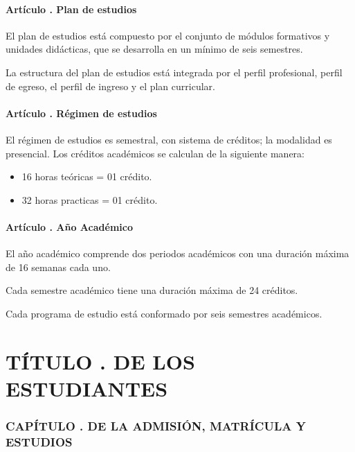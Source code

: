 \subsection{Artículo . Plan de estudios}
\addtocounter{ns}{1}
El plan de estudios está compuesto por el conjunto de módulos formativos y unidades didácticas, que se desarrolla en un mínimo de seis semestres. 

La estructura del plan de estudios está integrada por el perfil profesional, perfil de egreso, el perfil de ingreso y el plan curricular.
\subsection{Artículo . Régimen de estudios}
\addtocounter{ns}{1}
El régimen de estudios es semestral, con sistema de créditos; la modalidad es presencial. Los créditos académicos se calculan de la siguiente manera:
\begin{itemize}
\item 16 horas teóricas = 01 crédito. 
\item 32 horas practicas = 01 crédito. 
\end{itemize}
\subsection{Artículo . Año Académico}
\addtocounter{ns}{1}
El año académico comprende dos periodos académicos con una duración máxima de 16 semanas cada uno. 

Cada semestre académico tiene una duración máxima de 24 créditos. 

Cada programa de estudio está conformado por seis semestres académicos.
\part{TÍTULO . DE LOS ESTUDIANTES}
\addtocounter{ns}{1}
\section{CAPÍTULO . DE LA ADMISIÓN, MATRÍCULA Y ESTUDIOS}
\addtocounter{re}{1}

